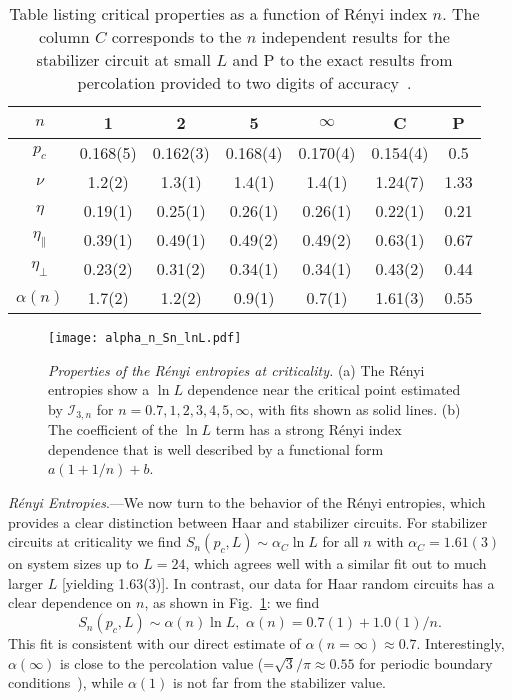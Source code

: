\documentclass[prl,twocolumn,aps,showpacs,amsmath,amssymb,superscriptaddress,floatfix,longbibliography]{revtex4-1}
\begin{document}
\begin{table}[h!]
  \begin{center}
    \begin{tabular}{ccccccc}
 \hline
\hline
     $n$ & 1 & 2 & 5
      & $\infty$ & C & P\\
    \hline
    $p_c$ & 0.168(5) & 0.162(3) & 0.168(4) 
    & 0.170(4) & 0.154(4) & 0.5\\
    \hline
  $\nu$ & 1.2(2) & 1.3(1) & 1.4(1) 
  & 1.4(1) & 1.24(7) & 1.33\\
  \hline
  $\eta$ & 0.19(1) & 0.25(1) & 0.26(1)
   & 0.26(1) & 0.22(1) & 0.21\\
    \hline
  $\eta_\parallel$ & 0.39(1) & 0.49(1) & 0.49(2) 
  & 0.49(2) & 0.63(1) & 0.67\\
  \hline
    $\eta_\perp$ & 0.23(2) & 0.31(2) & 0.34(1) 
    & 0.34(1) & 0.43(2) & 0.44\\
  \hline
  $\alpha(n)$ & 1.7(2) & 1.2(2) & 0.9(1) & 0.7(1) & 1.61(3) & 0.55
  \\
       \hline
       \hline
    \end{tabular}
  \end{center}
  \caption{Table listing critical properties as a function of R\'enyi index $n$. The column $C$ corresponds to the $n$ independent results for the stabilizer circuit at small $L$ and P to the exact results from percolation provided to two digits of accuracy~\cite{perc}.}
  \label{tab:table1}
\end{table}


\begin{figure}[tb]
\centering
           \texttt{[image: alpha\_n\_Sn\_lnL.pdf]}
   \caption{\emph{Properties of the R\'enyi entropies at criticality.} (a) The R\'enyi entropies show a $\ln L$ dependence near the critical point estimated by $\mathcal{I}_{3,n}$ for $n = 0.7,1,2,3,4,5,\infty$, with fits shown as solid lines. (b) The coefficient of the $\ln L$ term has a strong R\'enyi index dependence that is well described by a functional form $a(1 + 1/n) + b$.}
  \label{fig:Sn}
\end{figure}

\emph{R\'enyi Entropies}.---We now turn to the behavior of the R\'enyi entropies, which provides a clear distinction between Haar and stabilizer circuits. For stabilizer circuits at criticality we find $S_n(p_c,L) \sim \alpha_C \ln L$ for all $n$ with $\alpha_C = 1.61(3)$ on system sizes up to $L=24$, which agrees well with a similar fit out to much larger $L$ [yielding 1.63(3)]. In contrast, our data for Haar random circuits has a clear dependence on $n$, as shown in Fig.~\ref{fig:Sn}: we find
\begin{equation}
S_n(p_c,L) \sim \alpha(n) \ln L, \,  \, \alpha(n) = 0.7(1) + 1.0(1)/n.
\end{equation}
This fit is consistent with our direct estimate of $\alpha(n =\infty) \approx 0.7$. Interestingly, $\alpha(\infty)$ is close to the percolation value (=$\sqrt{3}/\pi \approx 0.55$ for periodic boundary conditions~\cite{Cardy00}), while $\alpha(1)$ is not far from the stabilizer value.
\end{document}
